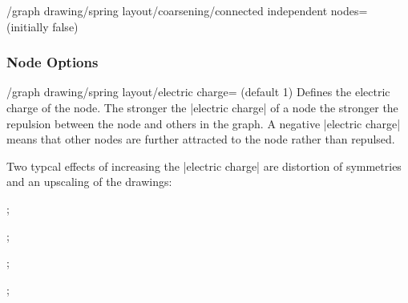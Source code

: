 \begin{key}{/graph drawing/spring layout/coarsening/connected
  independent nodes= (initially false)}

\end{key}

\subsubsection{Node Options}

\begin{key}{/graph drawing/spring layout/electric charge= (default 1)}
  Defines the electric charge of the node. The stronger the 
  |electric charge| of a node the stronger the repulsion between the
  node and others in the graph. A negative |electric charge| means that
  other nodes are further attracted to the node rather than repulsed.

  Two typcal effects of increasing the |electric charge| are distortion
  of symmetries and an upscaling of the drawings:
  

  \begin{codeexample}[width=5cm] 
\tikz {};

\tikz {};

\tikz {};

\tikz {};
  \end{codeexample}
\end{key}

%

